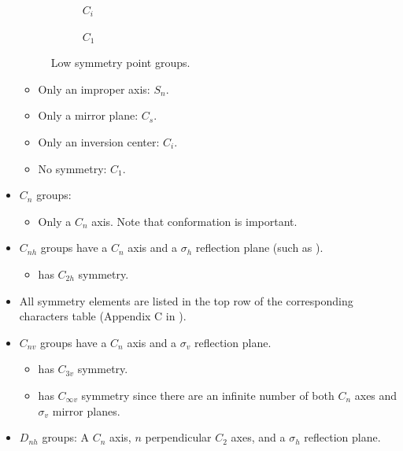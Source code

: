 \documentclass[../main.tex]{subfiles}
\begin{document}
\begin{itemize}
\begin{figure}[h!]
\begin{subfigure}[b]{0.24\linewidth}
            \caption{$C_i$}
            \label{fig:lowSymmetryc}
        \end{subfigure}
        \begin{subfigure}[b]{0.24\linewidth}
            \centering
            \footnotesize
            \caption{$C_1$}
            \label{fig:lowSymmetryd}
        \end{subfigure}
        \caption{Low symmetry point groups.}
        \label{fig:lowSymmetry}
    \end{figure}
    \begin{itemize}
        \item Only an improper axis: $S_n$.
        \item Only a mirror plane: $C_s$.
        \item Only an inversion center: $C_i$.
        \item No symmetry: $C_1$.
    \end{itemize}
    \item $C_n$ groups:
    \begin{itemize}
        \item Only a $C_n$ axis. Note that conformation is important.
    \end{itemize}
    \item $C_{nh}$ groups have a $C_n$ axis and a $\sigma_h$ reflection plane (such as ).
    \begin{itemize}
        \item {} has $C_{2h}$ symmetry.
    \end{itemize}
    \item All symmetry elements are listed in the top row of the corresponding characters table (Appendix C in \textcite{bib:MiesslerFischerTarr}).
    \item $C_{nv}$ groups have a $C_n$ axis and a $\sigma_v$ reflection plane.
    \begin{itemize}
        \item {} has $C_{3v}$ symmetry.
        \item {} has $C_{\infty v}$ symmetry since there are an infinite number of both $C_n$ axes and $\sigma_v$ mirror planes.
    \end{itemize}
    \item $D_{nh}$ groups: A $C_n$ axis, $n$ perpendicular $C_2$ axes, and a $\sigma_h$ reflection plane.
    \begin{itemize}

\end{itemize}
\end{itemize}
\end{document}
